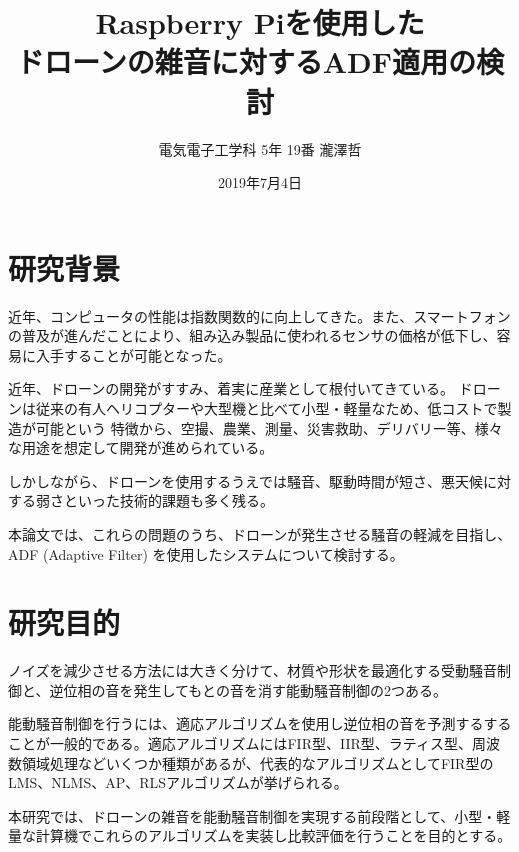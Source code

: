 \documentclass[a4paper, twocolumn]{ltjsarticle}
\title{Raspberry Piを使用した\\ドローンの雑音に対するADF適用の検討}
\author{電気電子工学科 5年 19番 瀧澤哲}
\date{2019年7月4日}
\begin{document}
%

\maketitle
  
\section{研究背景}
  近年、コンピュータの性能は指数関数的に向上してきた。また、スマートフォンの普及が進んだことにより、組み込み製品に使われるセンサの価格が低下し、容易に入手することが可能となった。

  近年、ドローンの開発がすすみ、着実に産業として根付いてきている。%
  ドローンは従来の有人ヘリコプターや大型機と比べて小型・軽量なため、低コストで製造が可能という%
  特徴から、空撮、農業、測量、災害救助、デリバリー等、様々な用途を想定して開発が進められている。

  しかしながら、ドローンを使用するうえでは騒音、駆動時間が短さ、悪天候に対する弱さといった技術的課題も多く残る。

  本論文では、これらの問題のうち、ドローンが発生させる騒音の軽減を目指し、ADF (Adaptive Filter) を使用したシステムについて検討する。

\section{研究目的}
  ノイズを減少させる方法には大きく分けて、材質や形状を最適化する受動騒音制御と、逆位相の音を発生してもとの音を消す能動騒音制御の2つある。


  能動騒音制御を行うには、適応アルゴリズムを使用し逆位相の音を予測するすることが一般的である。適応アルゴリズムにはFIR型、IIR型、ラティス型、周波数領域処理などいくつか種類があるが、代表的なアルゴリズムとしてFIR型のLMS、NLMS、AP、RLSアルゴリズムが挙げられる。
  
  本研究では、ドローンの雑音を能動騒音制御を実現する前段階として、小型・軽量な計算機でこれらのアルゴリズムを実装し比較評価を行うことを目的とする。

  
\end{document}
